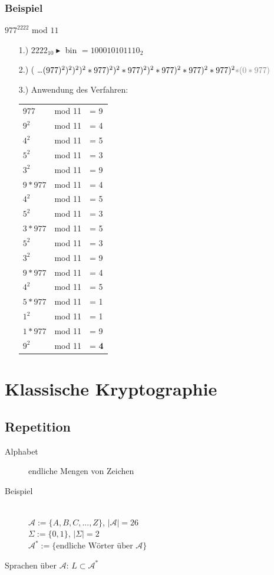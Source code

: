 \documentclass[10pt]{article}
\newcommand{\Pota}{\mathcal{A}}
\newcommand{\T}[1]{\text{#1}} %
\begin{document}
\subsubsection{Beispiel}
$977^{2222}$ mod $11$
\begin{itemize}
	\item[1.)] $2222_{10} \blacktriangleright$ bin $= 100010101110_2$
	\item[2.)] ( \dots $ (977)^2)^2)^2)^2*977)^2)^2*977)^2)^2*977)^2*977)^2*977)^2 {\color{gray} *(0*977)}$
	\item[3.)] Anwendung des Verfahren: \\
	\begin{tabular}{l l l}
	 977 & mod 11 & = 9 \\
	 $9^2$ & mod 11 & = 4 \\
	 $4^2$ & mod 11 & = 5 \\
	 $5^2$ & mod 11 & = 3 \\
	 $3^2$ & mod 11 & = 9 \\
	 $9*977$ & mod 11 & = 4\\
	 $4^2$ & mod 11 & = 5\\
	 $5^2$ & mod 11 & = 3\\
	 $3*977$ & mod 11 & = 5\\
	 $5^2$ & mod 11 & = 3\\
	 $3^2$ & mod 11 & = 9\\
	 $9*977$ & mod 11 & = 4\\
	 $4^2$ & mod 11 & = 5\\
	 $5*977$ & mod 11 & = 1\\
	 $1^2$ & mod 11 & = 1\\
	 $1*977$ & mod 11 & = 9\\
	 $9^2$ & mod 11 & = \textbf{4}
	\end{tabular}
\end{itemize}

\newpage
\section{Klassische Kryptographie}
\setcounter{subsection}{-1}
\subsection{Repetition}
\begin{description}
	\item[Alphabet] endliche Mengen von Zeichen
	\item[Beispiel] \hfill \\
		$\Pota := \{A,B,C, ..., Z\}$, $|\Pota|=26$ \\
		$\Sigma := \{0,1\}$, $|\Sigma|=2$\\
		$\Pota ^*:=\{\T{endliche Wörter über }\Pota\}$
\end{description}
Sprachen über $\Pota$: $L\subset\Pota ^*$
\end{document}
